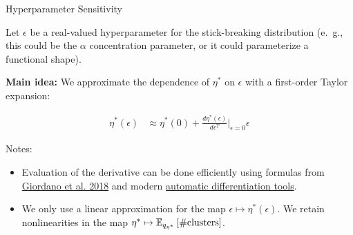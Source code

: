 \begin{frame}{Hyperparameter Sensitivity}

Let $\epsilon$ be a real-valued hyperparameter for the stick-breaking distribution
(e.\ g., this could be the $\alpha$ concentration parameter, or it could parameterize a functional shape).

\pause

{\bf Main idea: } We approximate the dependence of $\eta^*$ on $\epsilon$ with a first-order
Taylor expansion:

\begin{align*}
  \eta^*(\epsilon)  &\approx  \eta^*(0) +
  \frac{d \eta^*(\epsilon)}{d\epsilon^T}\Big|_{\epsilon=0} \epsilon
\end{align*}

\pause

Notes:
\begin{itemize}
\item Evaluation of the derivative can be done efficiently using formulas from
{\color{blue} \href{https://arxiv.org/abs/1709.02536}{Giordano et al. 2018}}
and modern
{\color{blue} \href{https://jax.readthedocs.io/en/latest/}{automatic differentiation tools}}.

\item We only use a linear approximation for the map $\epsilon \mapsto \eta^*(\epsilon)$. We retain nonlinearities in the map $\eta^* \mapsto
\mathbb{E}_{q_{\eta^*}} \left[ \#\text{clusters} \right]$.

\end{itemize}
\end{frame}
